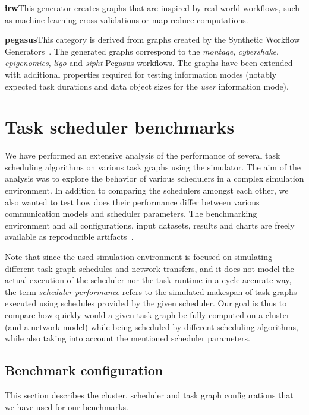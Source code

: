 \vspace{1mm}\noindent\textbf{irw}\quad This generator creates graphs that are inspired by real-world
workflows, such as machine learning cross-validations or map-reduce computations.

\vspace{1mm}\noindent\textbf{pegasus}\quad This category is derived from graphs created by the Synthetic
Workflow Generators~\cite{pegasusgraphs}. The generated graphs correspond to the \emph{montage},
\emph{cybershake}, \emph{epigenomics}, \emph{ligo} and \emph{sipht} Pegasus workflows.
The graphs have been extended with additional properties required for testing information modes
(notably expected task durations and data object sizes for the \emph{user} information mode).

\section{Task scheduler benchmarks}
\label{sec:estee-benchmarks}
We have performed an extensive analysis of the performance of several task scheduling algorithms on
various task graphs using the \estee{} simulator. The aim of the analysis was to
explore the behavior of various schedulers in a complex simulation environment. In addition to
comparing the schedulers amongst each other, we also wanted to test how does their performance differ
between various communication models and scheduler parameters. The benchmarking environment and
all configurations, input datasets, results and charts are freely available as reproducible
artifacts~\cite{estee_results}.

Note that since the used simulation environment is focused on simulating different task graph
schedules and network transfers, and it does not model the actual execution of the scheduler nor
the task runtime in a cycle-accurate way, the term \emph{scheduler performance} refers to the simulated
makespan of task graphs executed using schedules provided by the given scheduler. Our goal is thus
to compare how quickly would a given task graph be fully computed on a cluster (and a network
model) while being scheduled by different scheduling algorithms, while also taking into account the
mentioned scheduler parameters.

\subsection{Benchmark configuration}
This section describes the cluster, scheduler and task graph configurations that we have used for our
benchmarks.

